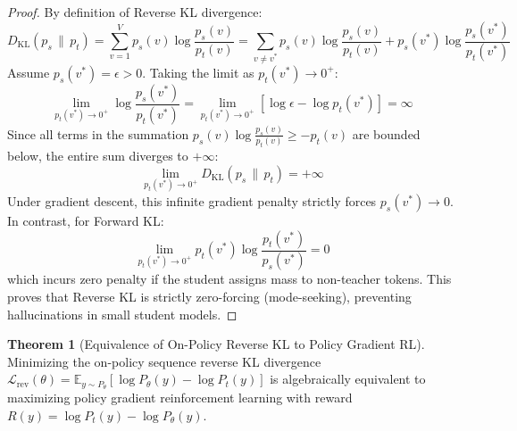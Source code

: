 \documentclass[11pt,a4paper]{article}
\theoremstyle{definition}
\newtheorem{theorem}{\textbf{Theorem}}[section]
\begin{document}
\begin{proof}
By definition of Reverse KL divergence:
{\boldmath
\begin{equation}
D_{\text{KL}}(p_s \,\|\, p_t) = \sum_{v=1}^V p_s(v) \log \frac{p_s(v)}{p_t(v)} = \sum_{v \neq v^*} p_s(v) \log \frac{p_s(v)}{p_t(v)} + p_s(v^*) \log \frac{p_s(v^*)}{p_t(v^*)}
\end{equation}
}
Assume $p_s(v^*) = \epsilon > 0$. Taking the limit as $p_t(v^*) \to 0^+$:
{\boldmath
\begin{equation}
\lim_{p_t(v^*) \to 0^+} \log \frac{p_s(v^*)}{p_t(v^*)} = \lim_{p_t(v^*) \to 0^+} \left[ \log \epsilon - \log p_t(v^*) \right] = \infty
\end{equation}
}
Since all terms in the summation $p_s(v) \log \frac{p_s(v)}{p_t(v)} \ge - p_t(v)$ are bounded below, the entire sum diverges to $+\infty$:
{\boldmath
\begin{equation}
\lim_{p_t(v^*) \to 0^+} D_{\text{KL}}(p_s \,\|\, p_t) = +\infty
\end{equation}
}
Under gradient descent, this infinite gradient penalty strictly forces $p_s(v^*) \to 0$. In contrast, for Forward KL:
{\boldmath
\begin{equation}
\lim_{p_t(v^*) \to 0^+} p_t(v^*) \log \frac{p_t(v^*)}{p_s(v^*)} = 0
\end{equation}
}
which incurs zero penalty if the student assigns mass to non-teacher tokens. This proves that Reverse KL is strictly zero-forcing (mode-seeking), preventing hallucinations in small student models.
\end{proof}

\begin{theorem}[Equivalence of On-Policy Reverse KL to Policy Gradient RL]
Minimizing the on-policy sequence reverse KL divergence $\mathcal{L}_{\text{rev}}(\theta) = \mathbb{E}_{y \sim P_\theta}[\log P_\theta(y) - \log P_t(y)]$ is algebraically equivalent to maximizing policy gradient reinforcement learning with reward $R(y) = \log P_t(y) - \log P_\theta(y)$.
\end{theorem}
\end{document}
